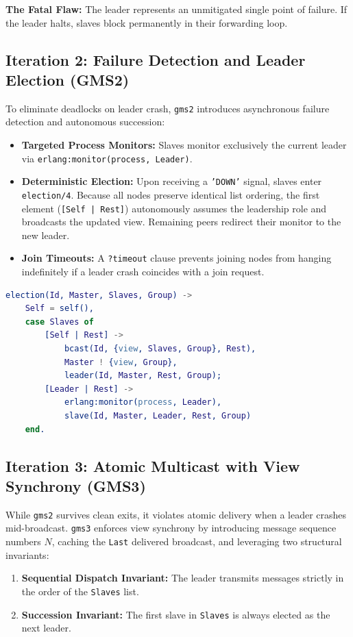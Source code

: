 \documentclass[a4paper, 11pt]{article}
\begin{document}
\noindent \textbf{The Fatal Flaw:} The leader represents an unmitigated single point of failure. If the leader halts, slaves block permanently in their forwarding loop.

\subsection{Iteration 2: Failure Detection and Leader Election (GMS2)}
To eliminate deadlocks on leader crash, \texttt{gms2} introduces asynchronous failure detection and autonomous succession:
\begin{itemize}
    \item \textbf{Targeted Process Monitors:} Slaves monitor exclusively the current leader via \texttt{erlang:monitor(process, Leader)}.
    \item \textbf{Deterministic Election:} Upon receiving a \texttt{'DOWN'} signal, slaves enter \texttt{election/4}. Because all nodes preserve identical list ordering, the first element (\texttt{[Self | Rest]}) autonomously assumes the leadership role and broadcasts the updated view. Remaining peers redirect their monitor to the new leader.
    \item \textbf{Join Timeouts:} A \texttt{?timeout} clause prevents joining nodes from hanging indefinitely if a leader crash coincides with a join request.
\end{itemize}

\begin{lstlisting}[language=erlang]
election(Id, Master, Slaves, Group) ->
    Self = self(),
    case Slaves of
        [Self | Rest] ->
            bcast(Id, {view, Slaves, Group}, Rest),
            Master ! {view, Group},
            leader(Id, Master, Rest, Group);
        [Leader | Rest] ->
            erlang:monitor(process, Leader),
            slave(Id, Master, Leader, Rest, Group)
    end.
\end{lstlisting}

\subsection{Iteration 3: Atomic Multicast with View Synchrony (GMS3)}
While \texttt{gms2} survives clean exits, it violates atomic delivery when a leader crashes mid-broadcast. \texttt{gms3} enforces view synchrony by introducing message sequence numbers $N$, caching the \texttt{Last} delivered broadcast, and leveraging two structural invariants:
\begin{enumerate}
    \item \textbf{Sequential Dispatch Invariant:} The leader transmits messages strictly in the order of the \texttt{Slaves} list.
    \item \textbf{Succession Invariant:} The first slave in \texttt{Slaves} is always elected as the next leader.
\end{enumerate}
\end{document}
